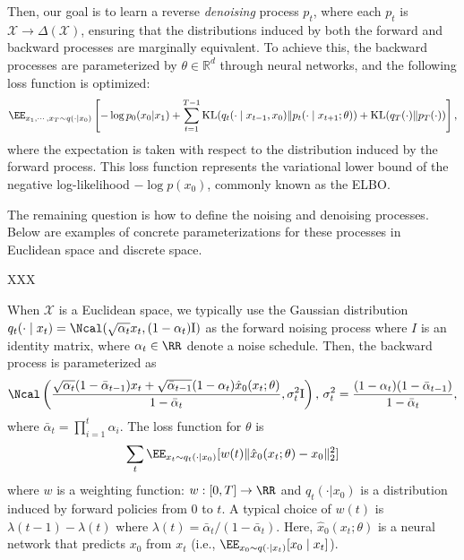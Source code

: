 \documentclass[12pt]{article} %
\begin{document}
{Then, our goal is to learn a reverse \emph{denoising} process ${p_t}$, where each $p_t$ is $\mathcal{X} \to \Delta(\mathcal{X})$, ensuring that the distributions induced by both the forward and backward processes are marginally equivalent. To achieve this, the backward processes are parameterized by $\theta \in \mathbb{R}^d$ through neural networks, and the following loss function is optimized:
\begin{align*} 
 \EE_{x_1,\cdots,x_T\sim q(\cdot|x_0)}\left [-\log p_0(x_0|x_1) + \sum_{t=1}^{T-1}\KL(q_{t}(\cdot \mid x_{t-1},x_0) \| p_{t}(\cdot \mid x_{t+1};\theta)) +  \KL( q_{T}(\cdot) \| p_{T}(\cdot) ) \right], 
\end{align*}
where the expectation is taken with respect to the distribution induced by the forward process. This loss function represents the variational lower bound of the negative log-likelihood $-\log p(x_0)$, commonly known as the ELBO.
  
The remaining question is how to define the noising and denoising processes. Below are examples of concrete parameterizations for these processes in Euclidean space and discrete space. 



\begin{Exabox}{XXX}
\begin{example} \label{exa:continuous}
When $\mathcal{X}$ is a Euclidean space, we typically use the Gaussian distribution $q_t(\cdot\mid x_{t}) = \Ncal(\sqrt{\alpha_t}x_{t}, (1- \alpha_t)\mathrm{I} )$ as the forward noising process where $I$ is an identity matrix, where $\alpha_t \in \RR$ denote a noise schedule. Then, the backward process is parameterized as 
\begin{align}\label{eq:mean}
    \Ncal\left (\frac{\sqrt{ \alpha_t}(1- \bar \alpha_{t-1}) x_t +  \sqrt{ \bar \alpha_{t-1}}(1-\alpha_t)\hat x_0(x_t;\theta) }{1 - \bar \alpha_t},\sigma^2_t \rI \right),\,\sigma^2_t= \frac{(1-\alpha_t)(1-\bar \alpha_{t-1}) }{1-\bar \alpha_t }, 
\end{align}
where $\bar \alpha_t= \prod_{i=1}^t \alpha_i $. The loss function for $\theta$ is 
\begin{align*}
    \sum_t \EE_{x_t \sim q_t(\cdot|x_0)}[w(t) \|\hat x_0(x_t;\theta)-x_0 \|^2_2]
\end{align*}
where $w$ is a weighting function: $w: [0, T] \to \RR$ and $q_t(\cdot|x_0)$ is a distribution induced by forward policies from $0$ to $t$. { A typical choice of $w(t)$ is $\lambda(t-1)-\lambda(t)$ where $\lambda(t)=\bar \alpha_{t}/(1-\bar \alpha_t)$. 
} 
Here, $\hat{x}_0(x_t; \theta)$ is a neural network that predicts $x_0$ from $x_t$ (i.e., $\EE_{x_0 \sim q(\cdot \mid x_t)}[x_0 \mid x_t]$).
\end{example}
\end{Exabox}


}
\end{document}

